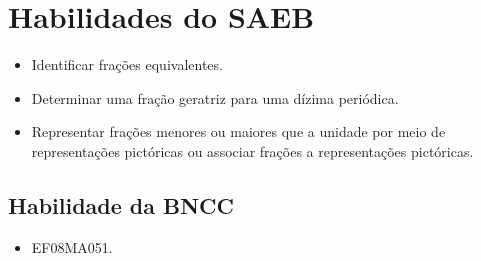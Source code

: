 \section{Habilidades do SAEB}

\begin{itemize}
\item
  Identificar frações equivalentes.
\item
  Determinar uma fração geratriz para uma dízima periódica.
  \item Representar frações menores ou maiores que a
unidade por meio de representações pictóricas ou associar frações a
representações pictóricas.
\end{itemize}

\subsection{Habilidade da BNCC}

\begin{itemize}
  \item EF08MA051.
\end{itemize}

